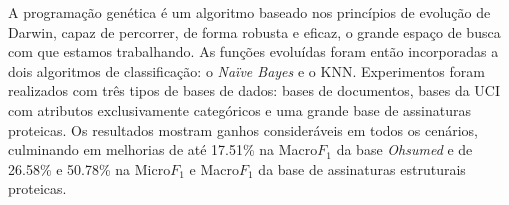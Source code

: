 A programação genética é um algoritmo baseado nos princípios de evolução de Darwin, capaz de percorrer, de forma robusta e eficaz, o grande espaço de busca com que estamos trabalhando. As funções evoluídas foram então incorporadas a dois algoritmos de classificação: o \textit{Naïve Bayes} e o \textsc{KNN}.
Experimentos foram realizados com três tipos de bases de dados: bases de documentos, bases da \textsc{UCI} com atributos exclusivamente categóricos e uma grande base de assinaturas proteicas. Os resultados mostram ganhos consideráveis em todos os cenários, culminando em melhorias de até 17.51\% na Macro$F_1$ da base \textit{Ohsumed} e de 26.58\% e 50.78\% na Micro$F_1$ e Macro$F_1$ da base de assinaturas estruturais proteicas.

